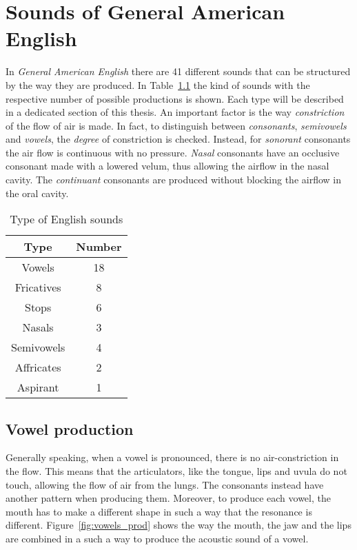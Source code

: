 \chapter{Sounds of General American English}
\label{ch:english_language}
In \textit{General American English} there are 41 different sounds that can be structured by the way they are produced\cite{stevens2000acoustic}. In Table~\ref{table:english_sounds} the kind of sounds with the respective number of possible productions is shown. Each type will be described in a dedicated section of this thesis. An important factor is the way \textit{constriction} of the flow of air is made. In fact, to distinguish between \textit{consonants}, \textit{semivowels} and \textit{vowels}, the \textit{degree} of constriction is checked. Instead, for \textit{sonorant} consonants the air flow is continuous with no pressure. \textit{Nasal} consonants have an occlusive consonant made with a lowered velum, thus allowing the airflow in the nasal cavity. The \textit{continuant} consonants are produced without blocking the airflow in the oral cavity.

\begin{table}[h]
    \centering
    \begin{tabular}{|c|c|}
        \hline
        \textbf{Type}& \textbf{Number} \\ \hline
        Vowels     & 18     \\ \hline
        Fricatives & 8      \\ \hline
        Stops      & 6      \\ \hline
        Nasals     & 3      \\ \hline
        Semivowels & 4      \\ \hline
        Affricates & 2      \\ \hline
        Aspirant   & 1      \\ \hline
    \end{tabular}
    \caption {Type of English sounds}
\label{table:english_sounds}
\end{table}


\section{Vowel production}
\label{sec:vowel_production}
Generally speaking, when a vowel is pronounced, there is no air-constriction in the flow. This means that the articulators, like the tongue, lips and uvula do not touch, allowing the flow of air from the lungs. The consonants instead have another pattern when producing them. Moreover, to produce each vowel, the mouth has to make a different shape in such a way that the resonance is different. Figure~\ref{fig:vowels_prod} shows the way the mouth, the jaw and the lips are combined in a such a way to produce the acoustic sound of a vowel.

